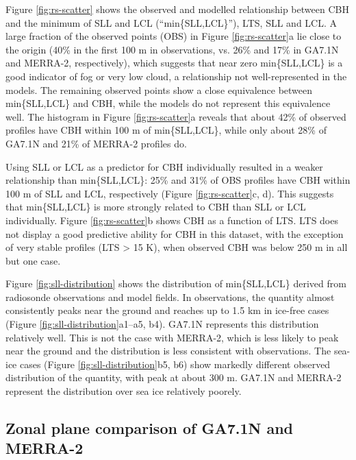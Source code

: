 Figure \ref{fig:rs-scatter} shows the observed and modelled relationship
between CBH and the minimum of SLL and LCL (``min\{SLL,LCL\}''), LTS, SLL and
LCL. A large fraction of the observed points (OBS) in Figure
\ref{fig:rs-scatter}a lie close to the origin (40\% in the first 100 m in
observations, vs. 26\% and 17\% in GA7.1N and MERRA-2, respectively), which
suggests that near zero min\{SLL,LCL\} is a good indicator of fog or very low
cloud, a relationship not well-represented in the models. The remaining
observed points show a close equivalence between min\{SLL,LCL\} and CBH, while
the models do not represent this equivalence well.  The histogram in Figure
\ref{fig:rs-scatter}a reveals that about 42\% of observed profiles have CBH
within 100 \unit{m} of min\{SLL,LCL\}, while only about 28\% of GA7.1N and 21\%
of MERRA-2 profiles do.

Using SLL or LCL as a predictor for CBH individually resulted in a weaker
relationship than min\{SLL,LCL\}: 25\% and 31\% of OBS profiles have CBH within
100 \unit{m} of SLL and LCL, respectively (Figure \ref{fig:rs-scatter}c, d).
This suggests that min\{SLL,LCL\} is more strongly related to CBH than SLL or LCL
individually. Figure \ref{fig:rs-scatter}b shows CBH as a function of LTS. LTS
does not display a good predictive ability for CBH in this dataset, with the
exception of very stable profiles (LTS > 15 K), when observed CBH was below 250
\unit{m} in all but one case.

Figure \ref{fig:sll-distribution} shows the distribution of min\{SLL,LCL\}
derived from radiosonde observations and model fields. In observations, the
quantity almost consistently peaks near the ground and reaches up to 1.5 km in
ice-free cases (Figure \ref{fig:sll-distribution}a1--a5, b4). GA7.1N represents
this distribution relatively well. This is not the case with MERRA-2, which is
less likely to peak near the ground and the distribution is less consistent
with observations.  The sea-ice cases (Figure \ref{fig:sll-distribution}b5, b6)
show markedly different observed distribution of the quantity, with peak at
about 300 m.  GA7.1N and MERRA-2 represent the distribution over sea ice
relatively poorely.

\subsection{Zonal plane comparison of GA7.1N and MERRA-2}
\label{sec:zonal-plane-comparison}

